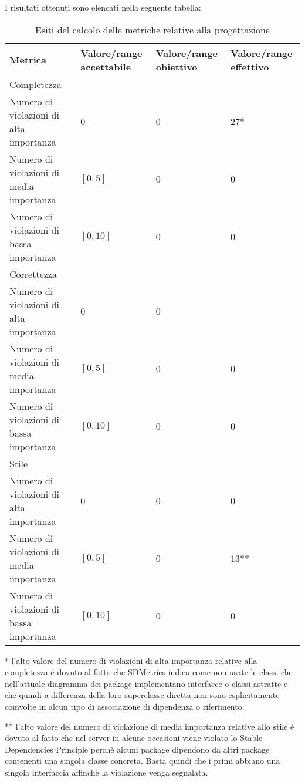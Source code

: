 		I risultati ottenuti sono elencati nella seguente tabella:
		\begin{table}[H]
		\begin{tabular}{|l|p{2.25cm}|p{2.25cm}|p{2.25cm}|}
		\hline
		\textbf{Metrica} & \textbf{Valore/range accettabile} & \textbf{Valore/range obiettivo} & \textbf{Valore/range effettivo} \\
		\hline
		Completezza & ~ & ~ & ~ \\
		Numero di violazioni di alta importanza & 0 & 0 & $27$* \\
		Numero di violazioni di media importanza & $[0, 5]$ & 0 & 0 \\
		Numero di violazioni di bassa importanza & $[0, 10]$ & 0 & 0 \\
		\hline
		Correttezza & ~ & ~ & ~ \\
		Numero di violazioni di alta importanza & 0 & 0 \\
		Numero di violazioni di media importanza & $[0, 5]$ & 0 & 0 \\
		Numero di violazioni di bassa importanza & $[0, 10]$ & 0 & 0 \\
		\hline
		Stile & ~ & ~ & ~ \\
		Numero di violazioni di alta importanza & 0 & 0 & 0 \\
		Numero di violazioni di media importanza & $[0, 5]$ & 0 & $13$** \\
		Numero di violazioni di bassa importanza & $[0, 10]$ & 0 & 0 \\
		\hline
		\end{tabular}
		\caption{Esiti del calcolo delle metriche relative alla progettazione}
		\end{table}
		
		* l'alto valore del numero di violazioni di alta importanza relative alla completezza è dovuto al fatto che SDMetrics indica come non usate le classi che nell'attuale diagramma dei package implementano interfacce o classi astratte e che quindi a differenza della loro superclasse diretta non sono esplicitamente coinvolte in alcun tipo di associazione di dipendenza o riferimento.
		
		** l'alto valore del numero di violazione di media importanza relative allo stile è dovuto al fatto che nel server in alcune occasioni viene violato lo Stable-Dependencies Principle perchè alcuni package dipendono da altri package contenenti una singola classe concreta. Basta quindi che i primi abbiano una singola interfaccia affinchè la violazione venga segnalata.

